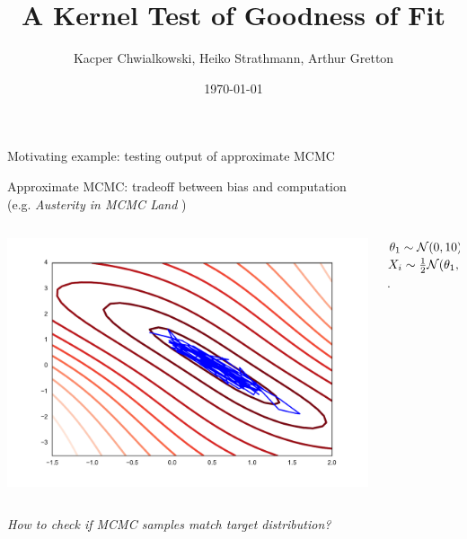 \documentclass{beamer}
\title{ A Kernel Test of Goodness of Fit}
\date{\today}
\author{Kacper Chwialkowski, Heiko Strathmann, Arthur Gretton}
\institute{Gatsby Unit and CS Department, UCL}
\begin{document}
\frame{\titlepage}
 \begin{frame}{Motivating example: testing output of approximate MCMC}
 \begin{center}
   Approximate MCMC: tradeoff between bias and computation\\ (e.g. {\em Austerity in MCMC Land} \cite{korattikara2013austerity})
   \end{center}
\begin{columns}
        \begin{column}{.7\textwidth}
   \includegraphics[width=\textwidth]{./img/sgld_trace_and_density.pdf} 
        \end{column}
        \begin{column}{.3\textwidth}
$\theta_{1}\sim{\cal N}(0,10);\theta_{2}\sim{\cal N}(0,1)$\\
$ X_{i}\sim\frac{1}{2}{\cal N}(\theta_{1},4)+\frac{1}{2}{\cal N}(\theta_{1}+\theta_{2},4) $.
        \end{column}
\end{columns}
 \vspace{0.3cm}
\begin{center}
 {\large\emph{{\color{red} How to check if MCMC samples match target distribution?}}}
 \end{center}
 \end{frame}
 
\end{document}
